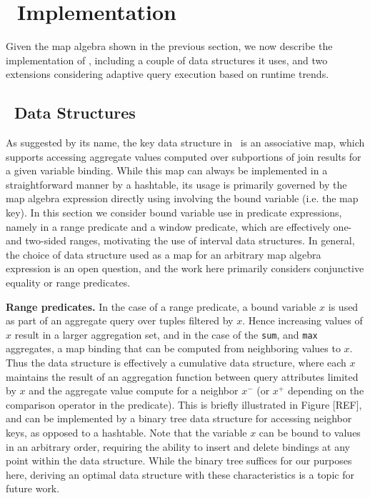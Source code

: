 \section{\compiler\ Implementation}
Given the map algebra shown in the previous section, we now describe
the implementation of \compiler, including a couple of data structures it
uses, and two extensions considering adaptive query execution based on runtime
trends.

\subsection{\compiler\ Data Structures}
As suggested by its name, the key data structure in \compiler\ is an
associative map, which supports accessing aggregate values computed over
subportions of join results for a given variable binding. While this map can
always be implemented in a straightforward manner by a hashtable, its usage is
primarily governed by the map algebra expression directly using involving the
bound variable (i.e. the map key). In this section we consider bound
variable use in predicate expressions, namely in a range predicate and a window
predicate, which are effectively one- and two-sided ranges, motivating the use
of interval data structures. In general, the choice of data structure used as a
map for an arbitrary map algebra expression is an open question, and the work
here primarily considers conjunctive equality or range predicates.

\textbf{Range predicates.}
In the case of a range predicate, a bound variable $x$ is used as part of an
aggregate query over tuples filtered by $x$. Hence increasing values of $x$
result in a larger aggregation set, and in the case of the \texttt{sum}, and
\texttt{max} aggregates, a map binding that can be computed from neighboring
values to $x$. Thus the data structure is effectively a cumulative data
structure, where each $x$ maintains the result of an aggregation function
between query attributes limited by $x$ and the aggregate value compute for
a neighbor $x^-$ (or $x^+$ depending on the comparison operator in the
predicate). This is briefly illustrated in Figure [REF], and can be implemented
by a binary tree data structure for accessing neighbor keys, as opposed to a
hashtable. Note that the variable $x$ can be bound to values in an arbitrary
order, requiring the ability to insert and delete bindings at any point within
the data structure. While the binary tree suffices for our purposes here,
deriving an optimal data structure with these characteristics is a topic for
future work.

